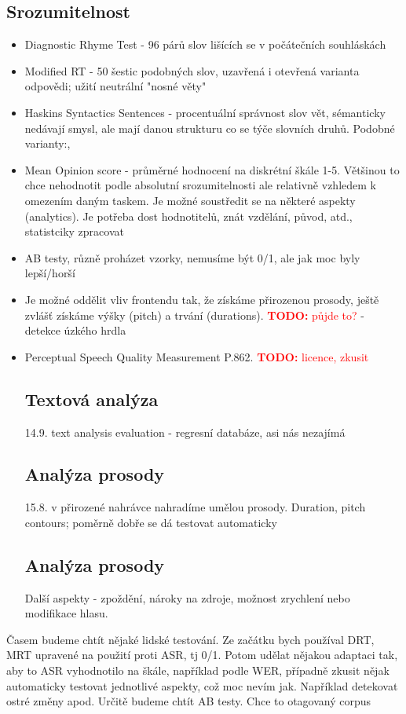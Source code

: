 \documentclass{article}
\newcommand{\td}[1]{\textcolor{red}{\textbf{TODO:} #1}}
\newcommand{\note}[1]{\textcolor{notegreen}{#1}}
\begin{document}
\subsection*{Srozumitelnost}
\begin{itemize}
\item Diagnostic Rhyme Test - 96 párů slov lišících se v počátečních souhláskách
\item Modified RT - 50 šestic podobných slov, uzavřená i otevřená varianta odpovědi; užití neutrální "nosné věty"
\item Haskins Syntactics Sentences\cite{egan1948test} - procentuální správnost slov vět, sémanticky nedávají smysl, ale mají danou strukturu co se týče slovních druhů. Podobné varianty:\cite{nye74test},\cite{howard92test}
\item Mean Opinion score - průměrné hodnocení na diskrétní škále 1-5. Většinou to chce nehodnotit podle absolutní srozumitelnosti ale relativně vzhledem k omezením daným taskem. Je možné soustředit se na některé aspekty (analytics). Je potřeba dost hodnotitelů, znát vzdělání, původ, atd., statistciky zpracovat
\item AB testy, různě proházet vzorky, nemusíme být 0/1, ale jak moc byly lepší/horší
\item Je možné oddělit vliv frontendu tak, že získáme přirozenou prosody, ještě zvlášť získáme výšky (pitch) a trvání (durations). \td{půjde to?} - detekce úzkého hrdla
\item Perceptual Speech Quality Measurement P.862. \td{licence, zkusit}
\subsection*{Textová analýza}14.9. text analysis evaluation - regresní databáze, asi nás nezajímá
\subsection*{Analýza prosody}15.8. v přirozené nahrávce nahradíme umělou prosody. Duration, pitch contours; poměrně dobře se dá testovat automaticky
\subsection*{Analýza prosody} Další aspekty - zpoždění, nároky na zdroje, možnost zrychlení nebo modifikace hlasu.
\end{itemize}
\note{Časem budeme chtít nějaké lidské testování. Ze začátku bych používal DRT, MRT upravené na použití proti ASR, tj 0/1. Potom udělat nějakou adaptaci tak, aby to ASR vyhodnotilo na škále, například podle WER, případně zkusit nějak automaticky testovat jednotlivé aspekty, což moc nevím jak. Například detekovat ostré změny apod. Určitě budeme chtít AB testy. Chce to otagovaný corpus}
\\
\end{document}
